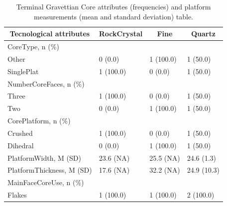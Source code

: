 \documentclass[12pt,twoside]{reedthesis}
\begin{document}
\begin{table}[!h]

\caption{\label{tab:unnamed-chunk-69}Phase 2 Elongated product measurements (width, length and thickness) with mean and standard deviation values.}
\centering
{}
\end{table}
\begin{table}[H]

\caption{\label{tab:unnamed-chunk-70}Terminal Gravettian Core attributes (frequencies) and platform measurements (mean and standard deviation) table.}
\centering
\begin{tabular}[t]{llll}
\toprule
\multicolumn{1}{c}{\textbf{Tecnological attributes}} & \multicolumn{1}{c}{\textbf{RockCrystal}} & \multicolumn{1}{c}{\textbf{Fine}} & \multicolumn{1}{c}{\textbf{Quartz}}\\
\midrule
CoreType, n (\%) &  &  & \\
Other & 0 (0.0) & 1 (100.0) & 1 (50.0)\\
SinglePlat & 1 (100.0) & 0 (0.0) & 1 (50.0)\\
NumberCoreFaces, n (\%) &  &  & \\
Three & 1 (100.0) & 0 (0.0) & 1 (50.0)\\
\addlinespace
Two & 0 (0.0) & 1 (100.0) & 1 (50.0)\\
CorePlatform, n (\%) &  &  & \\
Crushed & 1 (100.0) & 0 (0.0) & 1 (50.0)\\
Dihedral & 0 (0.0) & 1 (100.0) & 1 (50.0)\\
PlatformWidth, M (SD) & 23.6 (NA) & 25.5 (NA) & 24.6 (1.3)\\
\addlinespace
PlatformThickness, M (SD) & 17.6 (NA) & 32.2 (NA) & 24.9 (10.3)\\
MainFaceCoreUse, n (\%) &  &  & \\
Flakes & 1 (100.0) & 1 (100.0) & 2 (100.0)\\
\bottomrule
\end{tabular}
\end{table}
\end{document}
